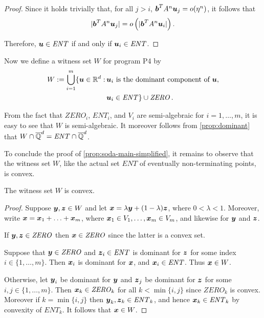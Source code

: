 \begin{proof}
Since it holds trivially that, for all $j>i$, $\boldsymbol{b}^{T} A^{n} \boldsymbol{u}_{j} = o(\eta^{n})$, it follows that
\begin{equation*}
  \lvert \boldsymbol{b}^T A^{n}\boldsymbol{u}_{j} \rvert = o\left(\lvert\boldsymbol{b}^{T} A^{n}
  \boldsymbol{u}_{i} \rvert\right).
\end{equation*}

Therefore, $\boldsymbol{u} \in \mathit{ENT}$ if and only if $\boldsymbol{u}_{i} \in \mathit{ENT}$.
\end{proof}

Now we define a witness set $W$ for program \textsf{P4} by
\begin{align*}
W :=   \bigcup_{i=1}^m \lbrace \boldsymbol{u}\in \mathbb{R}^{d}: \,
         & \boldsymbol{u}_i \mbox{ is the dominant component of } \boldsymbol{u},\\
         & \boldsymbol{u}_i \in \mathit{ENT} \rbrace
\cup \mathit{ZERO} \, .
\end{align*}

From the fact that $\mathit{ZERO}_i$, $\mathit{ENT}_i$, and $V_i$ are
semi-algebraic for $i=1,\ldots,m$, it is easy to see that $W$ is
semi-algebraic.  It moreover follows from \cref{prop:dominant}
that $W \cap \overline{\mathbb{Q}}^{d} = \mathit{ENT} \cap \overline{\mathbb{Q}}^{d}$.

To conclude the proof of \cref{prop:soda-main-simplified}, it
remains to observe that the witness set $W$, like the actual set
$\mathit{ENT}$ of eventually non-terminating points, is convex.
\begin{proposition}
The witness set $W$ is convex.
\end{proposition}
\begin{proof}
  Suppose $\boldsymbol y,\boldsymbol z\in W$ and let $\boldsymbol
  x=\lambda\boldsymbol y+(1-\lambda)\boldsymbol z$, where $0 < \lambda
  < 1$. Moreover, write
  $\boldsymbol{x}=\boldsymbol{x}_1+\ldots+\boldsymbol{x}_m$, where
  $\boldsymbol{x}_1\in V_1,\ldots,\boldsymbol{x}_m\in V_m$, and
  likewise for $\boldsymbol{y}$ and $\boldsymbol{z}$.

If $\boldsymbol{y},\boldsymbol{z}\in \mathit{ZERO}$ then
$\boldsymbol{x}\in \mathit{ZERO}$ since the latter is a convex set.

Suppose that $\boldsymbol{y}\in \mathit{ZERO}$ and $\boldsymbol{z}_i \in \mathit{ENT}$ is dominant for $\boldsymbol{z}$ for some index $i\in\lbrace 1,\ldots,m\rbrace$.
Then $\boldsymbol{x}_i$ is dominant for $\boldsymbol{x}$, and
$\boldsymbol{x}_i \in \mathit{ENT}$.  Thus $\boldsymbol{x}\in W$.

Otherwise, let $\boldsymbol y_i$ be dominant for $\boldsymbol y$ and
$\boldsymbol z_j$ be dominant for $\boldsymbol z$ for some
$i,j\in\lbrace 1,\ldots,m\rbrace$.  Then $\boldsymbol x_k\in \mathit{ZERO}_k$ for
all $k<\min\lbrace i,j\rbrace$ since $\mathit{ZERO}_k$ is convex.
Moreover if $k=\min\lbrace i,j\rbrace$ then $\boldsymbol
y_k,\boldsymbol z_k \in \mathit{ENT}_k$, and hence $\boldsymbol x_k
\in \mathit{ENT}_k$ by convexity of $\mathit{ENT}_k$.  It follows that
$\boldsymbol{x}\in W$.
\end{proof}

